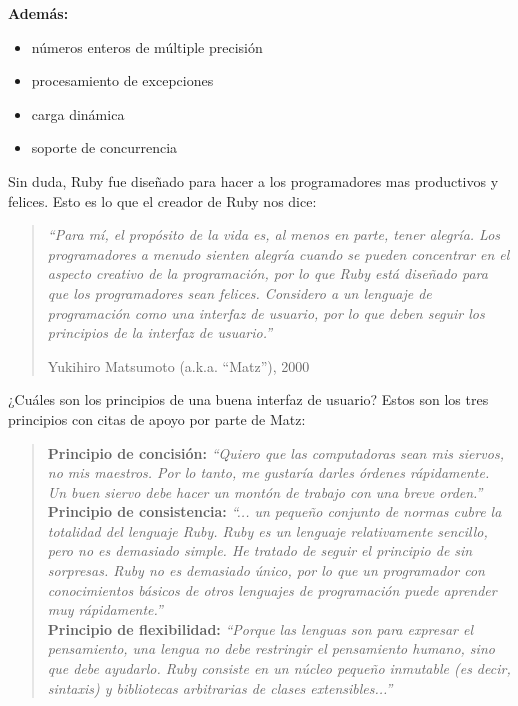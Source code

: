 \documentclass{article}
\begin{document}
\textbf{Además:}
\begin{itemize}
\itemsep=2pt \topsep=0pt \partopsep=0pt \parskip=0pt \parsep=0pt
	\item números enteros de múltiple precisión
	\item procesamiento de excepciones
	\item carga dinámica
	\item soporte de concurrencia
\end{itemize}
\bigskip\bigskip

Sin duda, Ruby fue diseñado para hacer a los programadores mas productivos y felices. Esto es lo que el creador de Ruby nos dice:

\begin{quotation}
\em``Para mí, el propósito de la vida es, al menos en parte, tener alegría. Los programadores a menudo sienten alegría cuando se pueden concentrar en el aspecto creativo de la programación, por lo que Ruby está diseñado para que los programadores sean felices. Considero a un lenguaje de programación como una interfaz de usuario, por lo que deben seguir los principios de la interfaz de usuario.''

\begin{flushright} Yukihiro Matsumoto (a.k.a. “Matz”), 2000 \end{flushright}
\end{quotation}

\bigskip
¿Cuáles son los principios de una buena interfaz de usuario? Estos son los tres principios con citas de apoyo por parte de Matz:\\

\begin{quotation}
\noindent \textbf{Principio de concisión:} \textit{``Quiero que las computadoras sean mis siervos, no mis maestros. Por lo tanto, me gustaría darles órdenes rápidamente. Un buen siervo debe hacer un montón de trabajo con una breve orden.''}\\

\noindent \textbf{Principio de consistencia:} \textit{``... un pequeño conjunto de normas cubre la totalidad del lenguaje Ruby. Ruby es un lenguaje relativamente sencillo, pero no es demasiado simple. He tratado de seguir el principio de \textit{sin sorpresas}. Ruby no es demasiado único, por lo que un programador con conocimientos básicos de otros lenguajes de programación puede aprender muy rápidamente.''}\\

\noindent \textbf{Principio de flexibilidad:} \textit{``Porque las lenguas son para expresar el pensamiento, una lengua no debe restringir el pensamiento humano, sino que debe ayudarlo. Ruby consiste en un núcleo pequeño inmutable (es decir, sintaxis) y bibliotecas arbitrarias de clases extensibles...''}
\end{quotation}
\end{document}
